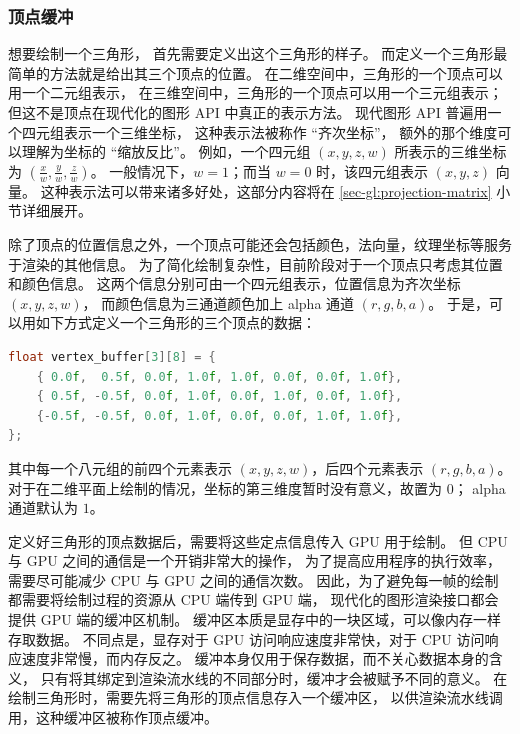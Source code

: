 \documentclass[fontset=windows]{ctexart}
\begin{document}
\subsubsection{顶点缓冲}

\label{sec-gl:vertex-buffer}

想要绘制一个三角形，
首先需要定义出这个三角形的样子。
而定义一个三角形最简单的方法就是给出其三个顶点的位置。
在二维空间中，三角形的一个顶点可以用一个二元组表示，
在三维空间中，三角形的一个顶点可以用一个三元组表示；
但这不是顶点在现代化的图形 API 中真正的表示方法。
现代图形 API 普遍用一个四元组表示一个三维坐标，
这种表示法被称作 “齐次坐标”，
额外的那个维度可以理解为坐标的 “缩放反比”。
例如，一个四元组 $(x,y,z,w)$ 所表示的三维坐标为
$(\frac{x}{w},\frac{y}{w},\frac{z}{w})$。
一般情况下，$w=1$；而当 $w=0$ 时，该四元组表示 $(x,y,z)$ 向量。
这种表示法可以带来诸多好处，这部分内容将在 \ref{sec-gl:projection-matrix} 小节详细展开。

除了顶点的位置信息之外，一个顶点可能还会包括颜色，法向量，纹理坐标等服务于渲染的其他信息。
为了简化绘制复杂性，目前阶段对于一个顶点只考虑其位置和颜色信息。
这两个信息分别可由一个四元组表示，位置信息为齐次坐标 $(x,y,z,w)$，
而颜色信息为三通道颜色加上 alpha 通道 $(r,g,b,a)$。
于是，可以用如下方式定义一个三角形的三个顶点的数据：

\begin{lstlisting}[language=c++]
float vertex_buffer[3][8] = {
    { 0.0f,  0.5f, 0.0f, 1.0f, 1.0f, 0.0f, 0.0f, 1.0f},
    { 0.5f, -0.5f, 0.0f, 1.0f, 0.0f, 1.0f, 0.0f, 1.0f},
    {-0.5f, -0.5f, 0.0f, 1.0f, 0.0f, 0.0f, 1.0f, 1.0f},
};
\end{lstlisting}

其中每一个八元组的前四个元素表示 $(x,y,z,w)$，后四个元素表示 $(r,g,b,a)$。
对于在二维平面上绘制的情况，坐标的第三维度暂时没有意义，故置为 $0$；
alpha 通道默认为 $1$。

定义好三角形的顶点数据后，需要将这些定点信息传入 GPU 用于绘制。
但 CPU 与 GPU 之间的通信是一个开销非常大的操作，
为了提高应用程序的执行效率，
需要尽可能减少 CPU 与 GPU 之间的通信次数。
因此，为了避免每一帧的绘制都需要将绘制过程的资源从 CPU 端传到 GPU 端，
现代化的图形渲染接口都会提供 GPU 端的缓冲区机制。
缓冲区本质是显存中的一块区域，可以像内存一样存取数据。
不同点是，显存对于 GPU 访问响应速度非常快，对于 CPU 访问响应速度非常慢，而内存反之。
缓冲本身仅用于保存数据，而不关心数据本身的含义，
只有将其绑定到渲染流水线的不同部分时，缓冲才会被赋予不同的意义。
在绘制三角形时，需要先将三角形的顶点信息存入一个缓冲区，
以供渲染流水线调用，这种缓冲区被称作顶点缓冲。
\end{document}
